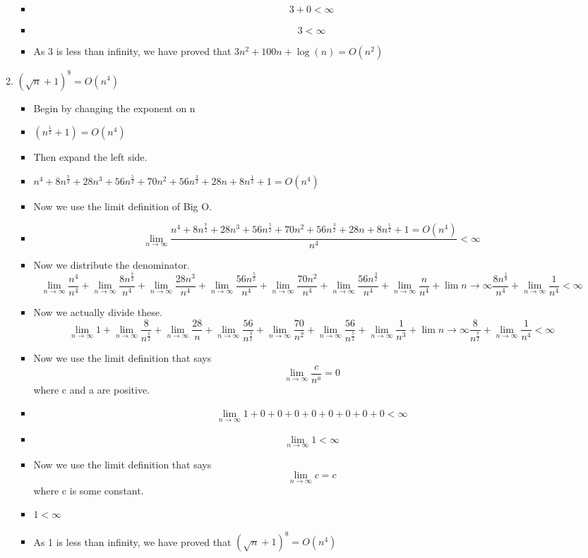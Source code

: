 \documentclass{article}
\begin{document}
\begin{enumerate}
\begin{enumerate}
\begin{itemize}
    \item {\Large $$3 + 0 < \infty$$}
    \item {\Large $$3 < \infty$$}
    \item As 3 is less than infinity, we have proved that $3n^{2} + 100n + \log{(n)} = O(n^{2})$
    \end{itemize}
  \item $(\sqrt{n} +1)^{8} = O(n^{4})$
    \begin{itemize}
    \item [] Begin by changing the exponent on n
    \item {\Large{$(n^{\frac{1}{2}} +1)=O(n^{4})$}}
    \item [] Then expand the left side.
    \item {\Large{$n^{4} + 8n^{\frac{7}{2}} +28n^{3} +56n^{\frac{5}{2}} + 70n^{2} +56n^{\frac{3}{2}} +28n +8n^{\frac{1}{2}} +1 = O(n^{4})$}}
    \item [] Now we use the limit definition of Big O.
    \item {\Large{$$\lim_{n \to \infty} \frac{n^{4} + 8n^{\frac{7}{2}} +28n^{3} +56n^{\frac{5}{2}} + 70n^{2} +56n^{\frac{3}{2}} +28n +8n^{\frac{1}{2}} +1 = O(n^{4})}{n^{4}} < \infty$$}}
    \item [] Now we distribute the denominator.
    $$\lim_{n \to \infty} \frac{n^{4}}{n^{4}} + \lim_{n \to \infty} \frac{8n^{\frac{7}{2}}}{n^{4}} + \lim_{n \to \infty} \frac{28n^{3}}{n^{4}} + \lim_{n \to \infty} \frac{56n^{\frac{5}{2}}}{n^{4}} + \lim_{n \to \infty} \frac{70n^{2}}{n^{4}} + \lim_{n \to \infty} \frac{56n^{\frac{3}{2}}}{n^{4}} + \lim_{n \to \infty} \frac{n}{n^{4}} + \lim{n \to \infty} \frac{8n^{\frac{1}{8}}}{n^{4}} + \lim_{n \to \infty} \frac{1}{n^{4}} < \infty$$
    \item [] Now we actually divide these.
    $$\lim_{n \to \infty} 1 + \lim_{n \to \infty} \frac{8}{n^{\frac{1}{2}}} + \lim_{n \to \infty} \frac{28}{n} + \lim_{n \to \infty} \frac{56}{n^{\frac{3}{2}}} + \lim_{n \to \infty} \frac{70}{n^{2}} + \lim_{n \to \infty} \frac{56}{n^{\frac{5}{2}}} + \lim_{n \to \infty} \frac{1}{n^{3}} + \lim{n \to \infty} \frac{8}{n^{\frac{7}{2}}} + \lim_{n \to \infty} \frac{1}{n^{4}} < \infty$$
    \item [] Now we use the limit definition that says {\Large $$\lim_{n \to \infty} \frac{c}{n^{a}} =0$$} where c and a are positive.
    \item {\Large{$$\lim_{n \to \infty} 1 +0+0+0+0+0+0+0+0 < \infty$$}}
    \item {\Large{$$\lim_{n \to \infty} 1 < \infty$$}}
    \item [] Now we use the limit definition that says $$\lim_{n \to \infty} c = c$$ where c is some constant.
    \item $1 < \infty$
    \item As 1 is less than infinity, we have proved that $(\sqrt{n} +1)^{8} =O(n^{4})$
    \end{itemize}
  \end{enumerate}


\end{enumerate}
\end{document}
